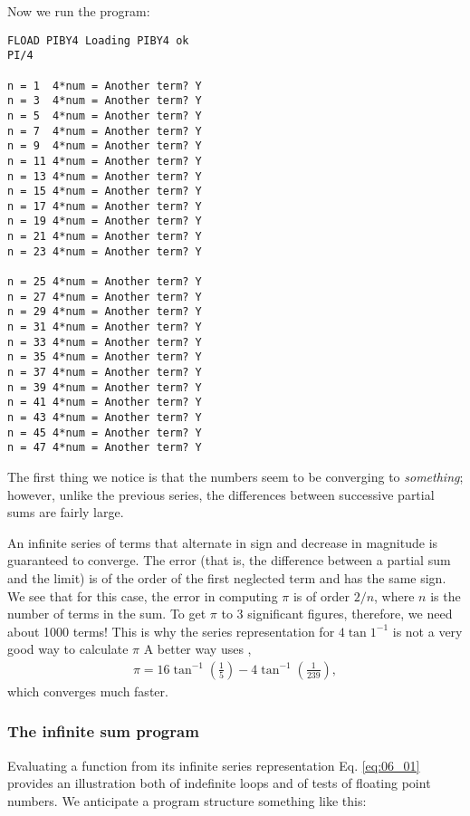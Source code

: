 Now we run the program:

\begin{lstlisting}
FLOAD PIBY4 Loading PIBY4 ok
PI/4

n = 1  4*num = Another term? Y
n = 3  4*num = Another term? Y
n = 5  4*num = Another term? Y
n = 7  4*num = Another term? Y
n = 9  4*num = Another term? Y
n = 11 4*num = Another term? Y
n = 13 4*num = Another term? Y
n = 15 4*num = Another term? Y
n = 17 4*num = Another term? Y
n = 19 4*num = Another term? Y
n = 21 4*num = Another term? Y
n = 23 4*num = Another term? Y

n = 25 4*num = Another term? Y
n = 27 4*num = Another term? Y
n = 29 4*num = Another term? Y
n = 31 4*num = Another term? Y
n = 33 4*num = Another term? Y
n = 35 4*num = Another term? Y
n = 37 4*num = Another term? Y
n = 39 4*num = Another term? Y
n = 41 4*num = Another term? Y
n = 43 4*num = Another term? Y
n = 45 4*num = Another term? Y
n = 47 4*num = Another term? Y
\end{lstlisting}

The first thing we notice is that the numbers seem to be converging to \textit{something}; however, unlike the previous series, the differences between successive partial sums are fairly large.

An infinite series of terms that alternate in sign and decrease in magnitude is guaranteed to converge. The error (that is, the difference between a partial sum and the limit) is of the order of the first neglected term and has the same sign. We see that for this case, the error in computing $\pi$ is of order $2/n$, where $n$ is the number of terms in the sum. To get $\pi$ to 3 significant figures, therefore, we need about 1000 terms! This is why the series representation for $4\tan{1}^{-1}$ is not a very good way to calculate $\pi$ A better way uses \eg,
\begin{align*}
    \pi = 16\tan^{-1}\left ( \frac{1}{5}\right ) - 4\tan^{-1}\left(\frac{1}{239}\right) ,
\end{align*}
which converges much faster.

\subsubsection{The infinite sum program}
Evaluating a function from its infinite series representation Eq. \ref{eq:06_01} provides an illustration both of indefinite loops and of tests of floating point numbers. We anticipate a program structure something like this:

